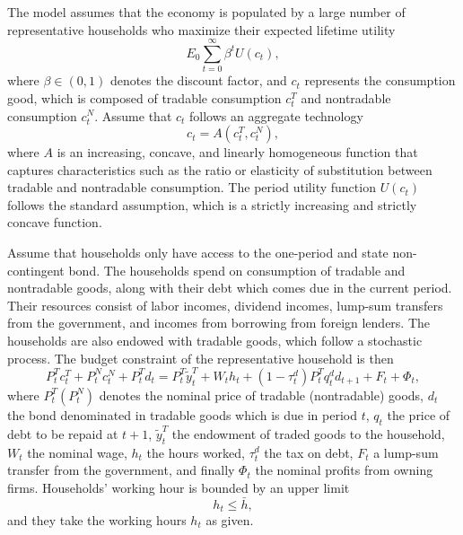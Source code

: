 The model assumes that the economy is populated by a large number of representative households who maximize their expected lifetime utility
\begin{equation}
    \label{eq:utility}
    E_0 \sum_{t=0}^\infty \beta^t U(c_t),
\end{equation}
where $\beta \in(0,1)$ denotes the discount factor,
and $c_t$ represents the consumption good, which is composed of
tradable consumption $c_t^T$ and nontradable consumption $c_t^N$.
Assume that $c_t$ follows an aggregate technology
\begin{equation}
    \label{eq:A}
    c_t = A(c^T_t, c^N_t),
\end{equation}
where $A$ is an increasing, concave, and linearly homogeneous function that captures characteristics such as the ratio or elasticity of substitution between tradable and nontradable consumption.
The period utility function $U(c_t)$ follows the standard assumption, which is a strictly increasing and strictly concave function.

Assume that households only have access to the one-period and state non-contingent bond.
The households spend on consumption of tradable and nontradable goods, along with their debt which comes due in the current period. Their resources consist of labor incomes, dividend incomes, lump-sum transfers from the government, and incomes from borrowing from foreign lenders. The households are also endowed with tradable goods, which follow a stochastic process.
The budget constraint of the representative household is then
\begin{equation}
    \label{eq:bc}
    P^T_t c^T_t + P^N_t c^N_t + P^T_t d_t =
    P^T_t \tilde{y}^T_t + W_t h_t + (1- \tau^d_t)P^T_t q^d_t d_{t+1} + F_t + \Phi_t,
\end{equation}
where $P^T_t (P^N_t)$ denotes the nominal price of tradable (nontradable) goods, $d_t$ the bond denominated in tradable goods which is due in period $t$, $q_t$ the price of debt to be repaid at $t+1$, $\tilde{y}^T_t$ the endowment of traded goods to the household, $W_t$ the nominal wage, $h_t$ the hours worked, $\tau^d_t$ the tax on debt, $F_t$ a lump-sum transfer from the government, and finally $\Phi_t$ the nominal profits from owning firms.
Households' working hour is bounded by an upper limit
\begin{equation}
    \label{eq:h-constraint}
    h_t \le \bar{h},
\end{equation}
and they take the working hours $h_t$ as given.

